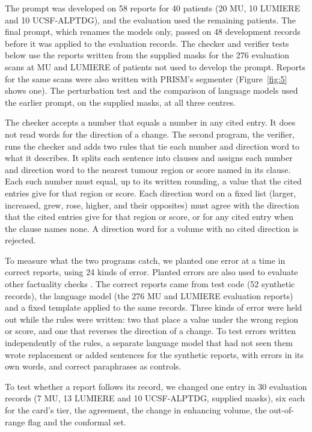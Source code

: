 \documentclass[largeformat]{interact} %
\begin{document}
The prompt was developed on 58 reports for 40 patients (20 MU, 10 LUMIERE and 10 UCSF-ALPTDG), and the evaluation
used the remaining patients. The final prompt, which renames the models only, passed on 48 development records before
it was applied to the evaluation records. The checker and verifier tests below use the reports written from the
supplied masks for the 276 evaluation scans at MU and LUMIERE of patients not used to develop the prompt. Reports
for the same scans were also written with PRISM's segmenter (Figure~\ref{fig:5} shows one). The perturbation test and
the comparison of language models used the earlier prompt, on the supplied masks, at all three centres.

The checker accepts a number that equals a number in any cited entry. It does not read words for the direction of a change. The second program, the verifier, runs the
checker and adds two rules that tie each number and direction word to what it describes. It splits each sentence into clauses and assigns
each number and direction word to the nearest tumour region or score named in its clause. Each such number must equal,
up to its written rounding, a value that the cited entries give for that region or score. Each direction word on a
fixed list (larger, increased, grew, rose, higher, and their opposites) must agree with the direction that the cited
entries give for that region or score, or for any cited entry when the clause names none. A direction word for a
volume with no cited direction is rejected.

To measure what the two programs catch, we planted one error at a time in correct reports, using 24 kinds of error. Planted errors are also used to evaluate other factuality checks
\citep{gabriel2021}. The correct reports came from test code (52 synthetic records), the language model (the 276 MU and
LUMIERE evaluation reports) and a fixed template applied to the same records. Three kinds of
error were held out while the rules were written: two that place a value under the wrong region or score, and one that
reverses the direction of a change. To test errors written independently of the rules, a separate language model that had not seen them wrote replacement or added sentences for the synthetic reports, with errors in its own words, and correct paraphrases
as controls.

To test whether a report follows its record, we changed one entry in 30 evaluation records (7 MU, 13 LUMIERE and 10
UCSF-ALPTDG, supplied masks), six each for the card's
tier, the agreement, the change in enhancing volume, the out-of-range flag and the conformal set. 
\end{document}
